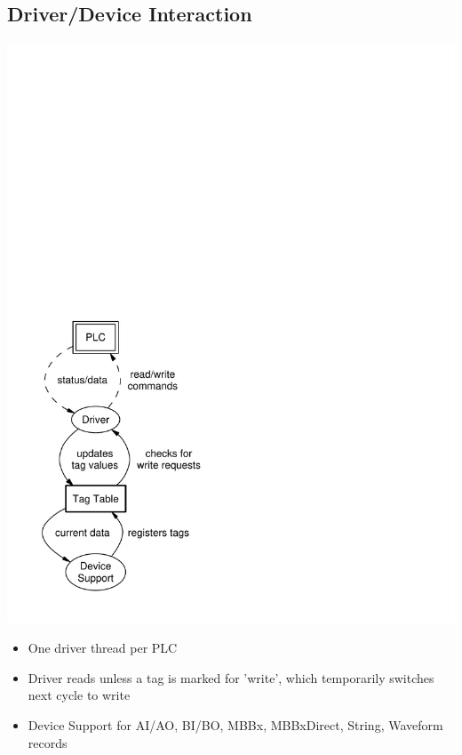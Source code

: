 \documentclass[letterpaper,landscape]{article}
\begin{document}
\begin{slide}
  \section{Driver/Device Interaction}
  \begin{minipage}[t]{0.49\textwidth}
    \vspace{-\baselineskip}
    \includegraphics[height=\textheight]{driv_dev_rec}
    \par\vspace{0pt}
  \end{minipage}%
  \begin{minipage}[t]{0.49\textwidth}
    \begin{itemize}
    \item One driver thread per PLC
    \item Driver reads unless a tag is marked for 'write', which
      temporarily switches next cycle to write
    \item Device Support for AI/AO, BI/BO, MBBx, MBBxDirect, String,
      Waveform records
    \end{itemize}
    \vfill
    ~~
  \end{minipage}%
\end{slide}
\end{document}

